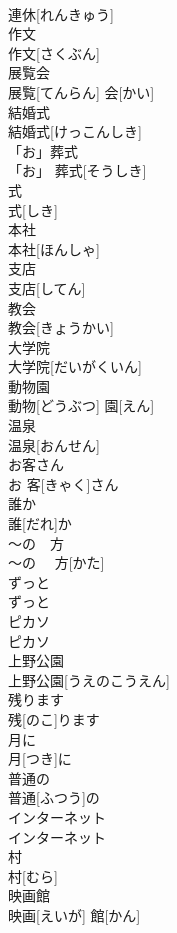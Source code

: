 \documentclass[8pt]{extreport}
\begin{document}
\begin{CJK}{UTF8}{min}
\\	連休[れんきゅう]	
\\	作文	
\\	作文[さくぶん]	
\\	展覧会	
\\	展覧[てんらん] 会[かい]	
\\	結婚式	
\\	結婚式[けっこんしき]	
\\	「お」葬式	
\\	「お」 葬式[そうしき]	
\\	式	
\\	式[しき]	
\\	本社	
\\	本社[ほんしゃ]	
\\	支店	
\\	支店[してん]	
\\	教会	
\\	教会[きょうかい]	
\\	大学院	
\\	大学院[だいがくいん]	
\\	動物園	
\\	動物[どうぶつ] 園[えん]	
\\	温泉	
\\	温泉[おんせん]	
\\	お客さん	
\\	お 客[きゃく]さん	
\\	誰か	
\\	誰[だれ]か	
\\	〜の　方	
\\	〜の　 方[かた]	
\\	ずっと	
\\	ずっと	
\\	ピカソ	
\\	ピカソ	
\\	上野公園	
\\	上野公園[うえのこうえん]	
\\	残ります	
\\	残[のこ]ります	
\\	月に	
\\	月[つき]に	
\\	普通の	
\\	普通[ふつう]の	
\\	インターネット	
\\	インターネット	
\\	村	
\\	村[むら]	
\\	映画館	
\\	映画[えいが] 館[かん]	

\end{CJK}
\end{document}
